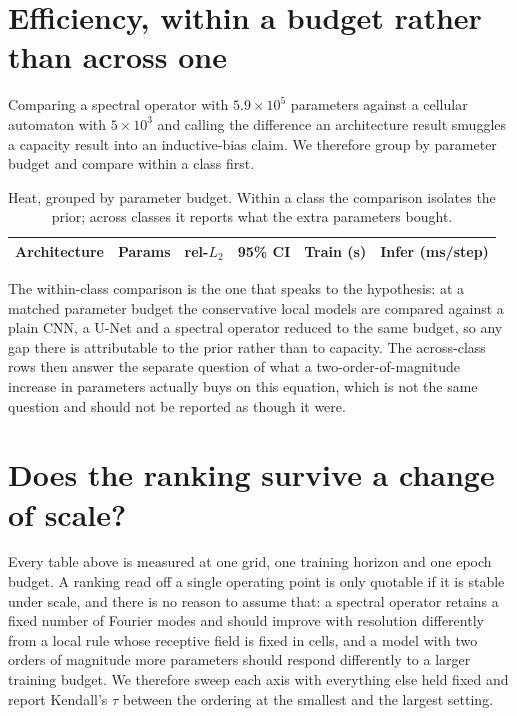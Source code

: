\documentclass{article}
\begin{document}
\section{Efficiency, within a budget rather than across one}
\label{sec:efficiency}

Comparing a spectral operator with $5.9\times10^5$ parameters against a cellular automaton
with $5\times10^3$ and calling the difference an architecture result smuggles a capacity
result into an inductive-bias claim. We therefore group by parameter budget and compare
within a class first.

\begin{table}[h]
\centering
\caption{Heat, grouped by parameter budget. Within a class the comparison isolates the
prior; across classes it reports what the extra parameters bought.}
\label{tab:efficiency}
\small
\begin{tabular}{lrccrr}
\toprule
Architecture & Params & rel-$L_2$ & 95\% CI & Train (s) & Infer (ms/step) \\
\midrule

\bottomrule
\end{tabular}
\end{table}

The within-class comparison is the one that speaks to the hypothesis: at a matched
parameter budget the conservative local models are compared against a plain CNN, a U-Net
and a spectral operator reduced to the same budget, so any gap there is attributable to the
prior rather than to capacity. The across-class rows then answer the separate question of
what a two-order-of-magnitude increase in parameters actually buys on this equation, which
is not the same question and should not be reported as though it were.

\section{Does the ranking survive a change of scale?}
\label{sec:scaling}

Every table above is measured at one grid, one training horizon and one epoch budget. A
ranking read off a single operating point is only quotable if it is stable under scale,
and there is no reason to assume that: a spectral operator retains a fixed number of
Fourier modes and should improve with resolution differently from a local rule whose
receptive field is fixed in cells, and a model with two orders of magnitude more
parameters should respond differently to a larger training budget. We therefore sweep each
axis with everything else held fixed and report Kendall's $\tau$ between the ordering at
the smallest and the largest setting.
\end{document}
